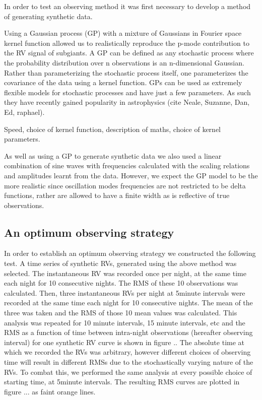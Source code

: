 \documentclass[useAMS, usenatbib]{aastex}
\newcommand{\integer}{5}
\begin{document}

In order to test an observing method it was first necessary to develop a method
of generating synthetic data.

Using a Gaussian process (GP) with a mixture of Gaussians in Fourier space
kernel function allowed us to realistically reproduce the p-mode contribution
to the RV signal of subgiants.
A GP can be defined as any stochastic process
where the probability distribution over n observations is an n-dimensional
Gaussian.
Rather than parameterizing the stochastic process itself, one parameterizes the
covariance of the data using a kernel function.
GPs can be used as extremely flexible models for stochastic processes and have
just a few parameters.
As such they have recently gained popularity in astrophysics (cite Neale,
Suzanne, Dan, Ed, raphael).

Speed, choice of kernel function, description of maths, choice of kernel
parameters.

As well as using a GP to generate synthetic data we also used a linear
combination of sine waves with frequencies calculated with the
\citet{Kjeldsen1995} scaling relations and amplitudes learnt from the data.
However, we expect the GP model to be the more realistic since oscillation
modes frequencies are not restricted to be delta functions, rather are allowed
to have a finite width as is reflective of true observations.

\subsection{An optimum observing strategy}

In order to establish an optimum observing strategy we constructed the
following test.
A time series of synthetic RVs, generated using the above method was selected.
The instantaneous RV was recorded once per night, at the same time each night
for 10 consecutive nights.
The RMS of these 10 observations was calculated.
Then, three instantaneous RVs per night at \integer minute intervals were
recorded at the same time each night for 10 consecutive nights.
The mean of the three was taken and the RMS of those 10 mean values was
calculated.
This analysis was repeated for 10 minute intervals, 15 minute intervals, etc
and the RMS as a function of time between intra-night observations
(hereafter observing interval) for one synthetic RV curve is shown in figure ..
The absolute time at which we recorded the RVs was arbitrary, however different
choices of observing time will result in different RMSs due to the
stochastically varying nature of the RVs.
To combat this, we performed the same analysis at every possible choice of
starting time, at \integer minute intervals.
The resulting RMS curves are plotted in figure ... as faint orange lines.
\end{document}
